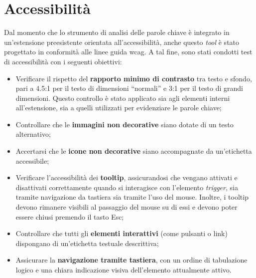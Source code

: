 \section{Accessibilità}

\par Dal momento che lo strumento di analisi delle parole chiave è integrato in un’estensione preesistente orientata all’accessibilità, anche questo \textit{tool} è stato progettato in conformità alle linee guida \gls{wcag}. A tal fine, sono stati condotti test di accessibilità con i seguenti obiettivi:
\begin{itemize}
  \item Verificare il rispetto del \textbf{rapporto minimo di contrasto} tra testo e sfondo, pari a 4.5:1 per il testo di dimensioni “normali” e 3:1 per il testo di grandi dimensioni. Questo controllo è stato applicato sia agli elementi interni all’estensione, sia a quelli utilizzati per evidenziare le parole chiave;
  \item Controllare che le \textbf{immagini non decorative} siano dotate di un testo alternativo;
  \item Accertarsi che le \textbf{icone non decorative} siano accompagnate da un’etichetta accessibile;
  \item Verificare l’accessibilità dei \textbf{tooltip}, assicurandosi che vengano attivati e disattivati correttamente quando si interagisce con l’elemento \textit{trigger}, sia tramite navigazione da tastiera sia tramite l’uso del mouse. Inoltre, i tooltip devono rimanere visibili al passaggio del mouse su di essi e devono poter essere chiusi premendo il tasto Esc;
  \item Controllare che tutti gli \textbf{elementi interattivi} (come pulsanti o link) dispongano di un’etichetta testuale descrittiva;
  \item Assicurare la \textbf{navigazione tramite tastiera}, con un ordine di tabulazione logico e una chiara indicazione visiva dell’elemento attualmente attivo.
\end{itemize}
